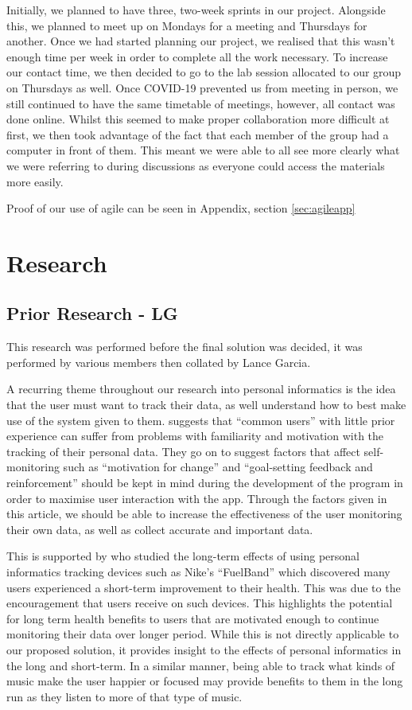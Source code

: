 \documentclass[11pt]{report}
\begin{document}
Initially, we planned to have three, two-week sprints in our project. Alongside this, we planned to meet up on Mondays for a meeting and Thursdays for another. Once we had started planning our project, we realised that this wasn’t enough time per week in order to complete all the work necessary. To increase our contact time, we then decided to go to the lab session allocated to our group on Thursdays as well. Once COVID-19 prevented us from meeting in person, we still continued to have the same timetable of meetings, however, all contact was done online. Whilst this seemed to make proper collaboration more difficult at first, we then took advantage of the fact that each member of the group had a computer in front of them. This meant we were able to all see more clearly what we were referring to during discussions as everyone could access the materials more easily.

Proof of our use of agile can be seen in Appendix, section \ref{sec:agileapp}

\chapter{Research}


\section{Prior Research - LG}

This research was performed before the final solution was decided, it was performed by various members then collated by Lance Garcia.\newline

A recurring theme throughout our research into personal informatics is the idea that the user must want to track their data, as well understand how to best make use of the system given to them. \cite{Rapp2014a} suggests that “common users” with little prior experience can suffer from problems with familiarity and motivation with the tracking of their personal data. They go on to suggest factors that affect self-monitoring such as “motivation for change” and “goal-setting feedback and reinforcement” should be kept in mind during the development of the program in order to maximise user interaction with the app. Through the factors given in this article, we should be able to increase the effectiveness of the user monitoring their own data, as well as collect accurate and important data.

This is supported by \cite{Fritz2014} who studied the long-term effects of using personal informatics tracking devices such as Nike’s “FuelBand” which discovered many users experienced a short-term improvement to their health. This was due to the encouragement that users receive on such devices. This highlights the potential for long term health benefits to users that are motivated enough to continue monitoring their data over longer period. While this is not directly applicable to our proposed solution, it provides insight to the effects of personal informatics in the long and short-term. In a similar manner, being able to track what kinds of music make the user happier or focused may provide benefits to them in the long run as they listen to more of that type of music.
\end{document}
